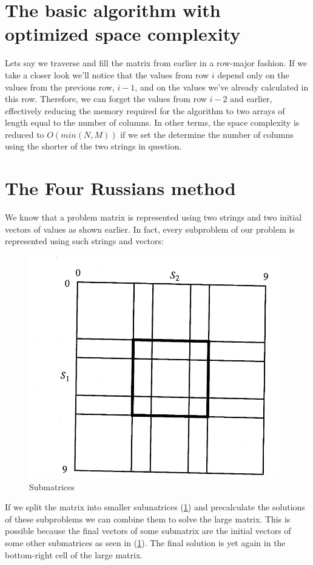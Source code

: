 \documentclass[times, utf8, seminar, numeric]{fer}
\begin{document}
\section{The basic algorithm with optimized space complexity}
Lets say we traverse and fill the matrix from earlier in a row-major fashion. If we take a closer look we'll notice that the values from row $i$ depend only on the values from the previous row, $i-1$, and on the values we've already calculated in this row. Therefore, we can forget the values from row $i-2$ and earlier, effectively reducing the memory required for the algorithm to two arrays of length equal to the number of columns. In other terms, the space complexity is reduced to $O(min(N, M))$ if we set the determine the number of columns using the shorter of the two strings in question.

\section{The Four Russians method}
We know that a problem matrix is represented using two strings and two initial vectors of values as shown earlier. In fact, every subproblem of our problem is represented using such strings and vectors:

\begin{figure}[H]
\centering
\includegraphics[scale=.25]{s1}
\caption{Submatrices}\label{pic:s1}
\end{figure}

If we split the matrix into smaller submatrices (\ref{pic:s1}) and precalculate the solutions of these subproblems we can combine them to solve the large matrix. This is possible because the final vectors of some submatrix are the initial vectors of some other submatrices as seen in (\ref{pic:s1}). The final solution is yet again in the bottom-right cell of the large matrix.
\end{document}
